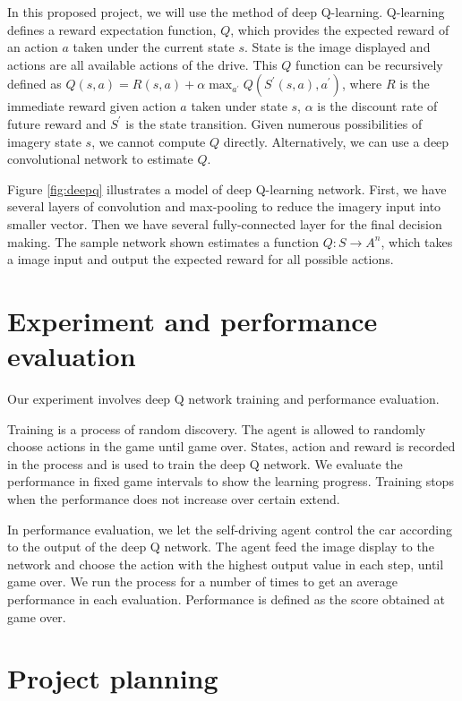 \documentclass[a4paper]{article}
\begin{document}
In this proposed project, we will use the method of deep Q-learning. Q-learning defines a reward expectation function, $Q$, which provides the expected reward of an action $a$ taken under the current state $s$. State is the image displayed and actions are all available actions of the drive. This $Q$ function can be recursively defined as $Q(s,a) = R(s,a) + \alpha \max_{a^{'}} Q(S^{'}(s,a),a^{'})$, where $R$ is the immediate reward given action $a$ taken under state $s$, $\alpha$ is the discount rate of future reward and $S^{'}$ is the state transition. Given numerous possibilities of imagery state $s$, we cannot compute $Q$ directly. Alternatively, we can use a deep convolutional network to estimate $Q$.

Figure \ref{fig:deepq} illustrates a model of deep Q-learning network. First, we have several layers of convolution and max-pooling to reduce the imagery input into smaller vector. Then we have several fully-connected layer for the final decision making. The sample network shown estimates a function $Q : S \rightarrow A^n$, which takes a image input and output the expected reward for all possible actions.

\section{Experiment and performance evaluation}

Our experiment involves deep Q network training and performance evaluation. 

Training is a process of random discovery. The agent is allowed to randomly choose actions in the game until game over. States, action and reward is recorded in the process and is used to train the deep Q network. We evaluate the performance in fixed game intervals to show the learning progress. Training stops when the performance does not increase over certain extend.

In performance evaluation, we let the self-driving agent control the car according to the output of the deep Q network. The agent feed the image display to the network and choose the action with the highest output value in each step, until game over. We run the process for a number of times to get an average performance in each evaluation. Performance is defined as the score obtained at game over.

\section {Project planning}
\end{document}
